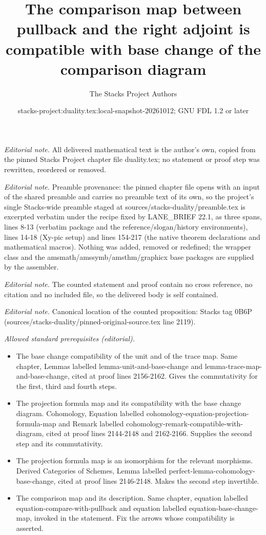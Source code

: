 \documentclass[10pt,a4paper]{amsart}
\title{The comparison map between pullback and the right adjoint is compatible with base change of the comparison diagram}
\author{The Stacks Project Authors}
\date{stacks-project:duality.tex:local-snapshot-20261012; GNU FDL 1.2 or later}
\theoremstyle{plain}
\theoremstyle{definition}
\theoremstyle{remark}
\numberwithin{equation}{subsection}
\begin{document}
\maketitle
\noindent\textit{Editorial note.} All delivered mathematical text is the author's own, copied from the pinned Stacks Project chapter file duality.tex; no statement or proof step was rewritten, reordered or removed.\par\medskip
\noindent\textit{Editorial note.} Preamble provenance: the pinned chapter file opens with an input of the shared preamble and carries no preamble text of its own, so the project's single Stacks-wide preamble staged at sources/stacks-duality/preamble.tex is excerpted verbatim under the recipe fixed by LANE\_BRIEF 22.1, as three spans, lines 8-13 (verbatim package and the reference/slogan/history environments), lines 14-18 (Xy-pic setup) and lines 154-217 (the native theorem declarations and mathematical macros). Nothing was added, removed or redefined; the wrapper class and the amsmath/amssymb/amsthm/graphicx base packages are supplied by the assembler.\par\medskip
\noindent\textit{Editorial note.} The counted statement and proof contain no cross reference, no citation and no included file, so the delivered body is self contained.\par\medskip
\noindent\textit{Editorial note.} Canonical location of the counted proposition: Stacks tag 0B6P (sources/stacks-duality/pinned-original-source.tex line 2119).\par\medskip
\noindent\textit{Allowed standard prerequisites (editorial).}\begin{itemize}
\item The base change compatibility of the unit and of the trace map. Same chapter, Lemmas labelled lemma-unit-and-base-change and lemma-trace-map-and-base-change, cited at proof lines 2156-2162. Gives the commutativity for the first, third and fourth steps.
\item The projection formula map and its compatibility with the base change diagram. Cohomology, Equation labelled cohomology-equation-projection-formula-map and Remark labelled cohomology-remark-compatible-with-diagram, cited at proof lines 2144-2148 and 2162-2166. Supplies the second step and its commutativity.
\item The projection formula map is an isomorphism for the relevant morphisms. Derived Categories of Schemes, Lemma labelled perfect-lemma-cohomology-base-change, cited at proof lines 2146-2148. Makes the second step invertible.
\item The comparison map and its description. Same chapter, equation labelled equation-compare-with-pullback and equation labelled equation-base-change-map, invoked in the statement. Fix the arrows whose compatibility is asserted.
\end{itemize}\medskip
\end{document}
